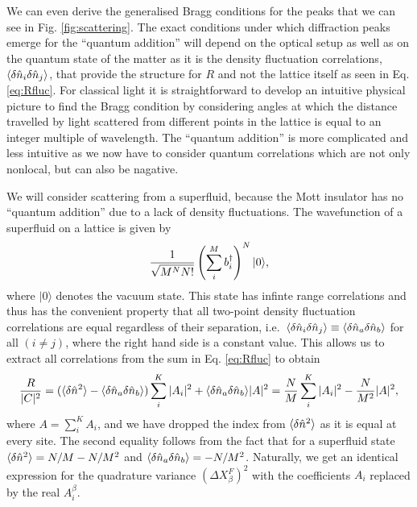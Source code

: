 We can even derive the generalised Bragg conditions for the peaks that
we can see in Fig. \ref{fig:scattering}. The exact conditions under
which diffraction peaks emerge for the ``quantum addition'' will
depend on the optical setup as well as on the quantum state of the
matter as it is the density fluctuation correlations,
$\langle \delta \hat{n}_i \delta \hat{n}_j \rangle$, that provide the structure for $R$ and
not the lattice itself as seen in Eq. \eqref{eq:Rfluc}. For classical
light it is straightforward to develop an intuitive physical picture
to find the Bragg condition by considering angles at which the
distance travelled by light scattered from different points in the
lattice is equal to an integer multiple of wavelength. The ``quantum
addition'' is more complicated and less intuitive as we now have to
consider quantum correlations which are not only nonlocal, but can
also be nagative.

We will consider scattering from a superfluid, because the Mott
insulator has no ``quantum addition'' due to a lack of density
fluctuations. The wavefunction of a superfluid on a lattice is given
by
\begin{equation}
  \frac{1}{\sqrt{M^N N!}} \left( \sum_i^M b^\dagger_i \right)^N |0 \rangle,
\end{equation}
where $| 0 \rangle$ denotes the vacuum state. This state has infinte
range correlations and thus has the convenient property that all
two-point density fluctuation correlations are equal regardless of
their separation,
i.e.~$\langle \delta \hat{n}_i \delta \hat{n}_j \rangle \equiv \langle \delta \hat{n}_a \delta \hat{n}_b \rangle$
for all $(i \ne j)$, where the right hand side is a constant
value. This allows us to extract all correlations from the sum in
Eq. \eqref{eq:Rfluc} to obtain
\begin{equation}
  \label{eq:RSF}
  \frac{R}{|C|^2} = (\langle \delta \hat{n}^2 \rangle - \langle \delta \hat{n}_a \delta \hat{n}_b \rangle) \sum_i^K
  |A_i|^2 + \langle \delta \hat{n}_a \delta \hat{n}_b \rangle |A|^2 = \frac{N}{M} \sum_i^K
  |A_i|^2 - \frac{N}{M^2} |A|^2,
\end{equation}
where $A = \sum_i^K A_i$, and we have dropped the index from
$\langle \delta \hat{n}^2 \rangle$ as it is equal at every site. The second
equality follows from the fact that for a superfluid state
$\langle \delta \hat{n}^2 \rangle = N/M - N/M^2$ and
$\langle \delta \hat{n}_a \delta \hat{n}_b \rangle = -N/M^2$. Naturally, we get an identical
expression for the quadrature variance $(\Delta X^F_\beta)^2$ with the
coefficients $A_i$ replaced by the real $A_i^\beta$.

